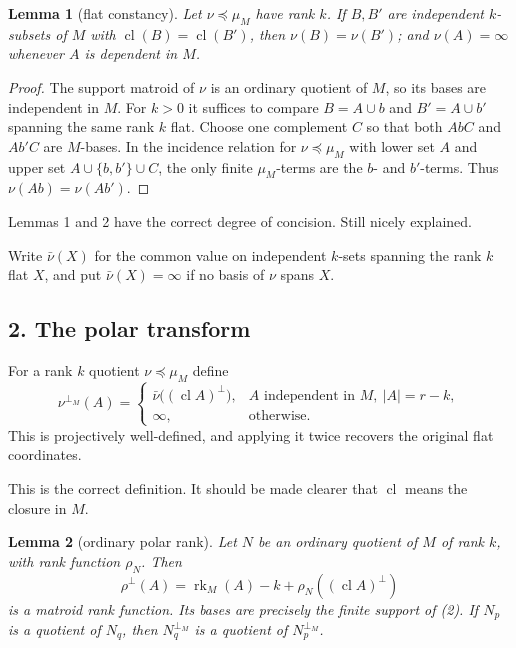 \documentclass[12pt]{article}
\newcommand{\rk}{\operatorname{rk}}
\newcommand{\cl}{\operatorname{cl}}
\newtheorem{lemma}{Lemma}
\newcommand{\review}[1]{\begin{reviewbox}#1\end{reviewbox}}
\begin{document}
\begin{lemma}[flat constancy]\label{lem:flatconst}
Let $\nu\preceq\mu_M$ have rank $k$.  If $B,B'$ are independent
$k$-subsets of $M$ with $\cl(B)=\cl(B')$, then $\nu(B)=\nu(B')$; and
$\nu(A)=\infty$ whenever $A$ is dependent in $M$.
\end{lemma}

\begin{proof}
The support matroid of $\nu$ is an ordinary quotient of $M$, so its
bases are independent in $M$.  For $k>0$ it suffices to compare
$B=A\cup b$ and $B'=A\cup b'$ spanning the same rank $k$ flat.  Choose
one complement $C$ so that both $AbC$ and $Ab'C$ are $M$-bases.  In the
incidence relation for $\nu\preceq\mu_M$ with lower set $A$ and upper
set $A\cup\{b,b'\}\cup C$, the only finite $\mu_M$-terms are the
$b$- and $b'$-terms.  Thus $\nu(Ab)=\nu(Ab')$.
\end{proof}
\review{Lemmas 1 and 2 have the correct degree of concision. Still nicely explained.}


Write $\bar\nu(X)$ for the common value on independent $k$-sets spanning
the rank $k$ flat $X$, and put $\bar\nu(X)=\infty$ if no basis of $\nu$
spans $X$.

\subsection*{2. The polar transform}

For a rank $k$ quotient $\nu\preceq\mu_M$ define
\[
 \nu^{\perp_M}(A)=
 \begin{cases}
   \bar\nu\bigl((\cl A)^\perp\bigr),
      & A\text{ independent in }M,\ |A|=r-k,\\
   \infty,&\text{otherwise.}
 \end{cases}                                                 \tag{2}
\]
This is projectively well-defined, and applying it twice recovers the
original flat coordinates.

\review{This is the correct definition. It should be made clearer that $\cl$ means the closure in $M$.}

\begin{lemma}[ordinary polar rank]\label{lem:ordinary}
Let $N$ be an ordinary quotient of $M$ of rank $k$, with rank function
$\rho_N$.  Then
\[
        \rho^\perp(A)=\rk_M(A)-k+\rho_N((\cl A)^\perp)          \tag{3}
\]
is a matroid rank function.  Its bases are precisely the finite support
of (2).  If $N_p$ is a quotient of $N_q$, then
$N_q^{\perp_M}$ is a quotient of $N_p^{\perp_M}$.
\end{lemma}
\end{document}
